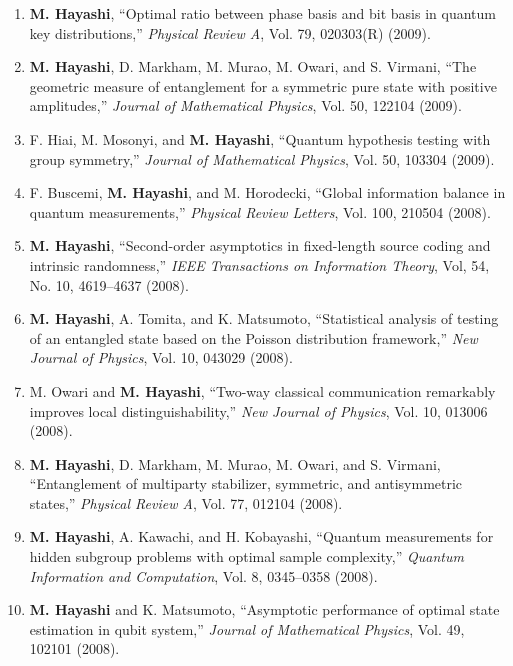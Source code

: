 \documentclass[a4paper,12pt,oneside]{article}
\begin{document}
\begin{enumerate}
\item   \textbf{M. Hayashi}, 
``Optimal ratio between phase basis and bit basis in quantum key distributions,'' 
{\em Physical Review A}, Vol. 79, 020303(R) (2009).

\item   \textbf{M. Hayashi}, D. Markham, M. Murao, M. Owari, and S. Virmani, 
``The geometric measure of entanglement for a symmetric pure state with positive amplitudes,'' 
{\em Journal of Mathematical Physics}, Vol. 50, 122104 (2009). 

\item   F. Hiai, M. Mosonyi, and \textbf{M. Hayashi}, 
``Quantum hypothesis testing with group symmetry,''
{\em Journal of Mathematical Physics}, Vol. 50, 103304 (2009).

\item   F. Buscemi, \textbf{M. Hayashi}, and M. Horodecki, 
``Global information balance in quantum measurements,'' 
{\em Physical Review Letters}, Vol. 100, 210504 (2008).

\item   \textbf{M. Hayashi}, 
``Second-order asymptotics in fixed-length source coding and intrinsic randomness,'' 
{\em IEEE Transactions on Information Theory}, Vol, 54, No. 10, 4619--4637 (2008). 

\item   \textbf{M. Hayashi}, A. Tomita, and K. Matsumoto, 
``Statistical analysis of testing of an entangled state based on the Poisson distribution framework,'' 
{\em New Journal of Physics}, Vol. 10, 043029 (2008).

\item   M. Owari and \textbf{M. Hayashi}, 
``Two-way classical communication remarkably improves local distinguishability,'' 
{\em New Journal of Physics}, Vol. 10, 013006 (2008).

\item  \textbf{M. Hayashi}, D. Markham, M. Murao, M. Owari, and S. Virmani, 
``Entanglement of multiparty stabilizer, symmetric, and antisymmetric states,'' 
{\em Physical Review A}, Vol. 77, 012104 (2008).

\item \textbf{M. Hayashi}, A. Kawachi, and H. Kobayashi, 
``Quantum measurements for hidden subgroup problems with optimal sample complexity,'' 
{\em Quantum Information and Computation}, Vol. 8, 0345--0358 (2008). 

\item   \textbf{M. Hayashi} and K. Matsumoto, 
``Asymptotic performance of optimal state estimation in qubit system,'' 
{\em Journal of Mathematical Physics}, Vol. 49, 102101 (2008).


\end{enumerate}
\end{document}
